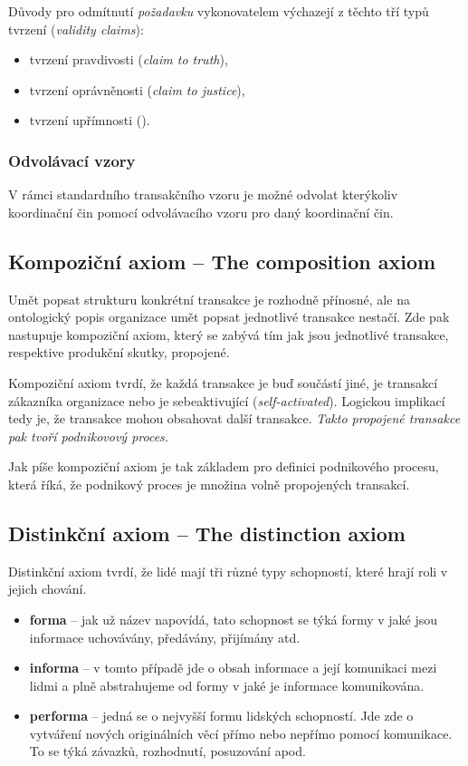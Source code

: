 \documentclass[]{article}
\begin{document}
Důvody pro odmítnutí \textit{požadavku} vykonovatelem výchazejí z těchto tří typů tvrzení (\textit{validity claims}):

\begin{itemize}
\item tvrzení pravdivosti (\textit{claim to truth}),
\item tvrzení oprávněnosti (\textit{claim to justice}),
\item tvrzení upřímnosti ().
\end{itemize}

\subsubsection{Odvolávací vzory}
V rámci standardního transakčního vzoru je možné odvolat kterýkoliv koordinační čin pomocí odvolávacího vzoru pro daný koordinační čin.

\subsection{Kompoziční axiom – The composition axiom}
Umět popsat strukturu konkrétní transakce je rozhodně přínosné, ale na ontologický popis organizace umět popsat jednotlivé transakce nestačí. Zde pak nastupuje kompoziční axiom, který se zabývá tím jak jsou jednotlivé transakce, respektive produkční skutky, propojené.

Kompoziční axiom tvrdí, že každá transakce je buď součástí jiné, je transakcí zákazníka organizace nebo je sebeaktivující (\textit{self-activated}). Logickou implikací tedy je, že transakce mohou obsahovat další transakce. \textit{Takto propojené transakce pak tvoří podnikovový proces.}

Jak píše \cite{Dietz2005} kompoziční axiom je tak základem pro definici podnikového procesu, která říká, že podnikový proces je množina volně propojených transakcí. 


\subsection{Distinkční axiom – The distinction axiom}
Distinkční axiom tvrdí, že lidé mají tři různé typy schopností, které hrají roli v jejich chování.

\begin{itemize}
\item \textbf{forma} – jak už název napovídá, tato schopnost se týká formy v jaké jsou informace uchovávány, předávány, přijímány atd.
\item \textbf{informa} – v tomto případě jde o obsah informace a její komunikaci mezi lidmi a plně abstrahujeme od formy v jaké je informace komunikována.
\item \textbf{performa} – jedná se o nejvyšší formu lidských schopností. Jde zde o vytváření nových originálních věcí přímo nebo nepřímo pomocí komunikace. To se týká závazků, rozhodnutí, posuzování apod.
\end{itemize}
\end{document}
